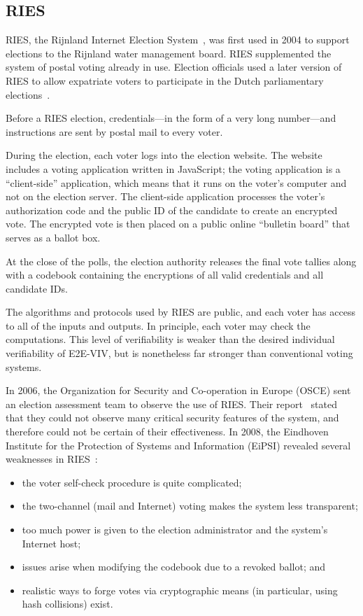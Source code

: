 \subsection{RIES}
\label{sec:ries} 

RIES, the Rijnland Internet Election System~\cite{hubbers2004}, was
first used in 2004 to support elections to the Rijnland water
management board. RIES supplemented the system of postal voting
already in use. Election officials used a later version of RIES to
allow expatriate voters to participate in the Dutch parliamentary
elections~\cite{gonggrijp2009}.

Before a RIES election, credentials---in the form of a very long
number---and instructions are sent by postal mail to every voter.

During the election, each voter logs into the election website. The
website includes a voting application written in JavaScript; the
voting application is a ``client-side'' application, which means that
it runs on the voter's computer and not on the election server. The
client-side application processes the voter's authorization code and
the public ID of the candidate to create an encrypted
vote. The encrypted vote is then placed on a public online ``bulletin
board'' that serves as a ballot box.

At the close of the polls, the election authority releases the final
vote tallies along with a codebook containing the encryptions of all
valid credentials and all candidate IDs.

The algorithms and protocols used by RIES are public, and each voter
has access to all of the inputs and outputs. In principle, each voter
may check the computations. This level of verifiability is weaker than
the desired individual verifiability of E2E-VIV, but is nonetheless
far stronger than conventional voting systems.

In 2006, the Organization for Security and Co-operation in Europe
(OSCE) sent an election assessment team to observe the use of
RIES. Their report~\cite{osce2007} stated that they could not observe
many critical security features of the system, and therefore could not
be certain of their effectiveness. In 2008, the Eindhoven Institute
for the Protection of Systems and Information (EiPSI) revealed several
weaknesses in RIES~\cite{hubbers2008}:

\begin{itemize}
  \item the voter self-check procedure is quite complicated;
  \item the two-channel (mail and Internet) voting makes the system
    less transparent;
  \item too much power is given to the election administrator and the
    system's Internet host;
  \item issues arise when modifying the codebook due to a revoked
    ballot; and
  \item realistic ways to forge votes via cryptographic means (in
    particular, using hash collisions) exist.
\end{itemize}

